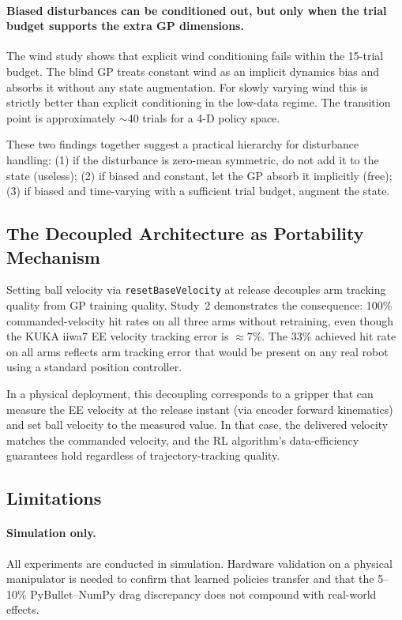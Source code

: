 \paragraph{Biased disturbances can be conditioned out, but only when the trial budget
supports the extra GP dimensions.}
The wind study shows that explicit wind conditioning fails within the 15-trial budget.
The blind GP treats constant wind as an implicit dynamics bias and absorbs it without
any state augmentation.
For slowly varying wind this is strictly better than explicit conditioning in the
low-data regime.
The transition point is approximately $\sim 40$ trials for a 4-D policy space.

These two findings together suggest a practical hierarchy for disturbance handling:
(1) if the disturbance is zero-mean symmetric, do not add it to the state (useless);
(2) if biased and constant, let the GP absorb it implicitly (free);
(3) if biased and time-varying with a sufficient trial budget, augment the state.

\subsection{The Decoupled Architecture as Portability Mechanism}
\label{sec:discussion:decoupled}

Setting ball velocity via \texttt{resetBaseVelocity} at release decouples arm tracking
quality from GP training quality.
Study~2 demonstrates the consequence: 100\% commanded-velocity hit rates on all three
arms without retraining, even though the KUKA iiwa7 EE velocity tracking error is
$\approx 7\%$.
The 33\% achieved hit rate on all arms reflects arm tracking error that would be
present on any real robot using a standard position controller.

In a physical deployment, this decoupling corresponds to a gripper that can measure the
EE velocity at the release instant (via encoder forward kinematics) and set ball velocity
to the measured value.
In that case, the delivered velocity matches the commanded velocity, and the RL
algorithm's data-efficiency guarantees hold regardless of trajectory-tracking quality.

\subsection{Limitations}
\label{sec:discussion:limitations}

\paragraph{Simulation only.}
All experiments are conducted in simulation.
Hardware validation on a physical manipulator is needed to confirm that learned policies
transfer and that the 5--10\% PyBullet--NumPy drag discrepancy does not compound with
real-world effects.

